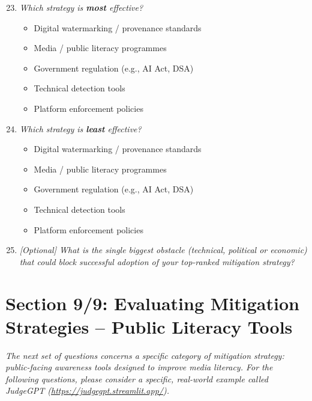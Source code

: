 \begin{enumerate}[label=\textbf{Q\arabic*.}, leftmargin=3em]
\setcounter{enumi}{22}

    \item[*] \textit{Which strategy is \textbf{most} effective?}
    \begin{itemize}
        \item[$\bigcirc$] Digital watermarking / provenance standards
        \item[$\bigcirc$] Media / public literacy programmes
        \item[$\bigcirc$] Government regulation (e.g., AI Act, DSA)
        \item[$\bigcirc$] Technical detection tools
        \item[$\bigcirc$] Platform enforcement policies
    \end{itemize}

    \item[*] \textit{Which strategy is \textbf{least} effective?}
    \begin{itemize}
        \item[$\bigcirc$] Digital watermarking / provenance standards
        \item[$\bigcirc$] Media / public literacy programmes
        \item[$\bigcirc$] Government regulation (e.g., AI Act, DSA)
        \item[$\bigcirc$] Technical detection tools
        \item[$\bigcirc$] Platform enforcement policies
    \end{itemize}

    \item \textit{[Optional] What is the single biggest obstacle (technical, political or economic) that could block successful adoption of your top-ranked mitigation strategy?}\\[2pt]
    \framebox[\linewidth]{\rule{0pt}{2em}}

\end{enumerate}

\section*{Section 9/9: Evaluating Mitigation Strategies -- Public Literacy Tools}

\noindent\textit{The next set of questions concerns a specific category of mitigation strategy: public-facing awareness tools designed to improve media literacy. For the following questions, please consider a specific, real-world example called JudgeGPT (\url{https://judgegpt.streamlit.app/}).}

